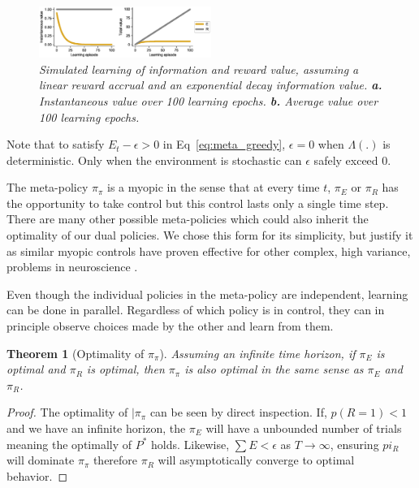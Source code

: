 \documentclass[9pt,twocolumn,twoside]{pnas-new}
\newtheorem{theorem}{Theorem}
\begin{document}
\begin{figure}
\includegraphics[width=0.5\textwidth]{figures/simple_E_R_timecourse.eps}
\caption{
    \textit{Simulated learning of information and reward value, assuming a linear reward accrual and an exponential decay information value. 
    \textbf{a.} Instantaneous value over 100 learning epochs.  
    \textbf{b.} Average value over 100 learning epochs.}
}
\label{fig:simple_E_R_timecourse}
\end{figure}

Note that to satisfy $E_t - \epsilon > 0$ in Eq~\ref{eq:meta_greedy}, $\epsilon = 0$ when $\Lambda(.)$ is deterministic. Only when the environment is stochastic can $\epsilon$ safely exceed 0.

The meta-policy $\pi_{\pi}$ is a myopic in the sense that at every time $t$, $\pi_E$ or $\pi_R$ has the opportunity to take control but this control lasts only a single time step. There are many other possible meta-policies which could also inherit the optimality of our dual policies. We chose this form for its simplicity, but justify it as similar myopic controls have proven effective for other complex, high variance, problems in neuroscience \cite{Hocker2019}.

Even though the individual policies in the meta-policy are independent, learning can be done in parallel. Regardless of which policy is in control, they can in principle observe choices made by the other and learn from them.   

\begin{theorem}[Optimality of $\pi_{\pi}$] \label{theorem:meta}
    Assuming an infinite time horizon, if $\pi_E$ is optimal and $\pi_R$ is optimal, then $\pi_{\pi}$ is also optimal in the same sense as $\pi_E$ and $\pi_R$.
\end{theorem}
\begin{proof}
    The optimality of $|\pi_{\pi}$ can be seen by direct inspection. If, $p(R = 1) < 1$ and we have an infinite horizon, the $\pi_E$ will have a unbounded number of trials meaning the optimally of $P^*$ holds. Likewise, $\sum E < \epsilon$ as $T \rightarrow \infty$, ensuring $pi_R$ will dominate $\pi_{\pi}$ therefore $\pi_R$ will asymptotically converge to optimal behavior.
\end{proof}
\end{document}
